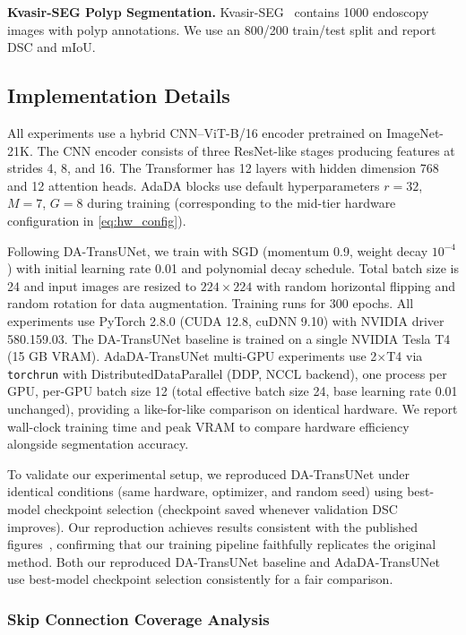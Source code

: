 \documentclass[conference]{IEEEtran}
\begin{document}
\textbf{Kvasir-SEG Polyp Segmentation.} Kvasir-SEG~\cite{jha2020kvasir} contains 1000 endoscopy images with polyp annotations. We use an 800/200 train/test split and report DSC and mIoU.

\subsection{Implementation Details}

All experiments use a hybrid CNN--ViT-B/16 encoder pretrained on ImageNet-21K. The CNN encoder consists of three ResNet-like stages producing features at strides 4, 8, and 16. The Transformer has 12 layers with hidden dimension 768 and 12 attention heads. AdaDA blocks use default hyperparameters $r=32$, $M=7$, $G=8$ during training (corresponding to the mid-tier hardware configuration in \eqref{eq:hw_config}).

Following DA-TransUNet, we train with SGD (momentum 0.9, weight decay $10^{-4}$) with initial learning rate 0.01 and polynomial decay schedule. Total batch size is 24 and input images are resized to $224 \times 224$ with random horizontal flipping and random rotation for data augmentation. Training runs for 300 epochs. All experiments use PyTorch 2.8.0 (CUDA 12.8, cuDNN 9.10) with NVIDIA driver 580.159.03. The DA-TransUNet baseline is trained on a single NVIDIA Tesla T4 (15 GB VRAM). AdaDA-TransUNet multi-GPU experiments use 2$\times$T4 via \texttt{torchrun} with DistributedDataParallel (DDP, NCCL backend), one process per GPU, per-GPU batch size 12 (total effective batch size 24, base learning rate 0.01 unchanged), providing a like-for-like comparison on identical hardware. We report wall-clock training time and peak VRAM to compare hardware efficiency alongside segmentation accuracy.

To validate our experimental setup, we reproduced DA-TransUNet under identical conditions (same hardware, optimizer, and random seed) using best-model checkpoint selection (checkpoint saved whenever validation DSC improves). Our reproduction achieves results consistent with the published figures~\cite{sun2024datransunet}, confirming that our training pipeline faithfully replicates the original method. Both our reproduced DA-TransUNet baseline and AdaDA-TransUNet use best-model checkpoint selection consistently for a fair comparison.

\subsubsection{Skip Connection Coverage Analysis}
\label{sec:skip_analysis}
\end{document}
